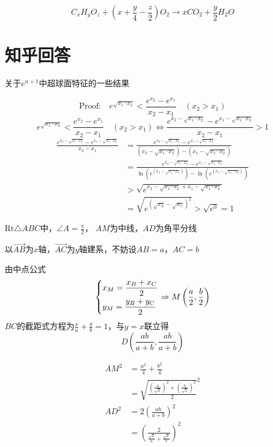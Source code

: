 \documentclass[UTF8]{article}
\begin{document}
$$
{C_xH_yO_z +(x +\frac y4-\frac z2)O_2\rightarrow xCO_2+\frac y2H_2O}
$$


\section{知乎回答}
关于$e^{n+1}$中超球面特征的一些结果 \cite{Wen}

$$
\text{Proof:}\quad{e^{\sqrt {{x_1} \cdot {x_2}} }} < \frac{{{e^{{x_2}}} - {e^{{x_1}}}}}{{{x_2} - {x_1}}}
\quad({x_2} > {x_1})$$
$$
{e^{\sqrt {{x_1} \cdot {x_2}} }} < \frac{{{e^{{x_2}}} - {e^{{x_1}}}}}{{{x_2} - {x_1}}}
\quad({x_2} > {x_1})
\Leftrightarrow 
\frac{{{e^{{x_2} - \sqrt {{x_1} \cdot {x_2}} }} - {e^{{x_1} - \sqrt {{x_1} \cdot {x_2}} }}}}{{{x_2} - {x_1}}} > 1
$$
$$\begin{aligned}
\frac{{{e^{{x_2} - \sqrt {{x_1} \cdot {x_2}} }} - {e^{{x_1} - \sqrt {{x_1} \cdot {x_2}} }}}}{{{x_2} - {x_1}}}&=\frac{{{e^{{x_2} - \sqrt {{x_1} \cdot {x_2}} }} - {e^{{x_1} - \sqrt {{x_1} \cdot {x_2}} }}}}{{({x_2} - \sqrt {{x_1} \cdot {x_2}} ) - ({x_1} - \sqrt {{x_1} \cdot {x_2}} )}}\\
&=\frac{{{e^{{x_2} - \sqrt {{x_1} \cdot {x_2}} }} - {e^{{x_1} - \sqrt {{x_1} \cdot {x_2}} }}}}{{\ln ({e^{({x_2} - \sqrt {{x_1} \cdot {x_2}} )}}) - \ln ({e^{({x_1} - \sqrt {{x_1} \cdot {x_2}} )}})}}\\
&>\sqrt {{e^{{x_2} - \sqrt {{x_1} \cdot {x_2}}  + {x_1} - \sqrt {{x_1} \cdot {x_2}} }}}\\
&=\sqrt {{e^{{{(\sqrt {{x_2}}  - \sqrt {{x_1}} )}^2}}}}>\sqrt {e^0}=1
\end{aligned}
$$

$\text{Rt}\triangle ABC$中，$\angle A=\frac\pi2$， $AM$为中线，$AD$为角平分线

以$\vec{AB}$为$x$轴，$\vec{AC}$为$y$轴建系，不妨设$AB=a$，$AC=b$

由中点公式
$$
\left\{ \begin{gathered}
  {x_M} = \frac{{{x_B} + {x_C}}}{2} \hfill \\
  {y_M} = \frac{{{y_B} + {y_C}}}{2} \hfill \\\end{gathered}  \right.\Rightarrow M\left( {\frac{a}{2},\frac{b}{2}} \right)
$$
$ BC$的截距式方程为$\frac{x}{a} + \frac{y}{b} = 1$，与$y=x$联立得
$$
D\left( {\frac{{ab}}{{a + b}},\frac{{ab}}{{a + b}}} \right)
$$

$$
\begin{aligned}
 A{M^2} &= \frac{{{a^2}}}{4} + \frac{{{b^2}}}{4}\\
	&={\sqrt {\frac{{{{\left( {\frac{a}{{\sqrt 2 }}} \right)}^2} + {{\left( {\frac{b}{{\sqrt 2 }}} \right)}^2}}}{2}} ^2}
\\AD^2&=2{\left( {\frac{{ab}}{{a + b}}} \right)^2}\\
&= {\left( {\frac{2}{{\frac{{\sqrt 2 }}{a} + \frac{{\sqrt 2 }}{b}}}} \right)^2}
\end{aligned}
$$
\end{document}
